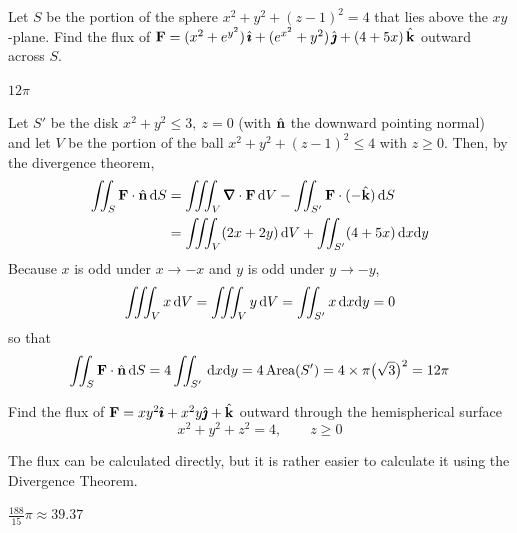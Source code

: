 \begin{question}[M317 2001A] %
Let $S$ be the portion of the sphere $x^2+y^2+(z-1)^2=4$
that lies above the $xy$-plane. Find the flux of 
$\mathbf{F}=(x^2+e^{y^2})\,\hat{\pmb{\imath}}+(e^{x^2}+y^2)\,\hat{\pmb{\jmath}} +(4+5x)\,\hat{\mathbf{k}}$ outward across
$S$.
\end{question}


\begin{answer} 
$12\pi$
\end{answer}

\begin{solution} 
Let $S'$ be the disk $x^2+y^2\le 3,\ z=0$ (with $\hat{\mathbf{n}}$ the downward 
pointing normal) and let $V$
be the portion of the ball $x^2+y^2+(z-1)^2\le 4$ with $z\ge 0$. 
Then, by the divergence theorem,
\begin{align*}
\dblInt_{S}\vF\cdot\hn\,\dee{S}
&=\tripInt_{V}\vnabla\cdot\vF\, \dee{V}
-\dblInt_{S'}\vF\cdot(-\hk)\,\dee{S}\\
&=\tripInt_{V}(2x+2y)\, \dee{V}
+\dblInt_{S'}(4+5x)\,\dee{x}\dee{y}
\end{align*}
Because $x$ is odd under $x\rightarrow-x$ and $y$ is odd under
$y\rightarrow -y$,
\begin{equation*}
\iiint_{V}x\, \mathrm{d}V=\iiint_{V}y\, \mathrm{d}V=\iint_{S'}x\,\mathrm{d}x\mathrm{d}y=0
\end{equation*}
so that
\begin{align*}
\iint_{S}\mathbf{F}\cdot\hat{\mathbf{n}}\,\mathrm{d}S
=4\iint_{S'}\,\mathrm{d}x\mathrm{d}y
=4\,\text{Area}(S')
=4\times \pi\big(\sqrt{3}\big)^2=12\pi 
\end{align*}

\end{solution}

\begin{question}[M317 1999A] %
Find the flux of $\mathbf{F}=xy^2\hat{\pmb{\imath}}+x^2y\hat{\pmb{\jmath}}+\hat{\mathbf{k}}$ outward through
the hemispherical surface 
\begin{equation*}
x^2+y^2+z^2=4,\qquad z\ge 0
\end{equation*}
\end{question}

\begin{hint} 
The flux can be calculated directly, but it is rather easier to 
calculate it using the Divergence Theorem.
\end{hint}

\begin{answer} 
$\frac{188}{15}\pi\approx39.37$
\end{answer}

